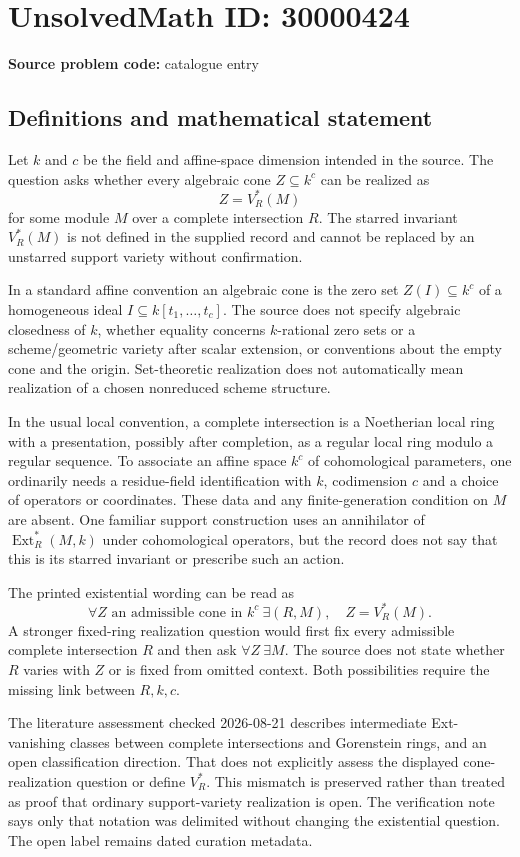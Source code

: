 \documentclass[11pt]{article}
\begin{document}
\section*{UnsolvedMath ID: 30000424}
\textbf{Source problem code:} catalogue entry
\subsection{Definitions and mathematical statement}
Let \(k\) and \(c\) be the field and affine-space dimension intended in the source. The question asks whether every algebraic cone \(Z\subseteq k^c\) can be realized as
\[
 Z=V_R^*(M)
\]
for some module \(M\) over a complete intersection \(R\). The starred invariant \(V_R^*(M)\) is not defined in the supplied record and cannot be replaced by an unstarred support variety without confirmation.

In a standard affine convention an algebraic cone is the zero set \(Z(I)\subseteq k^c\) of a homogeneous ideal \(I\subseteq k[t_1,\ldots,t_c]\). The source does not specify algebraic closedness of \(k\), whether equality concerns \(k\)-rational zero sets or a scheme/geometric variety after scalar extension, or conventions about the empty cone and the origin. Set-theoretic realization does not automatically mean realization of a chosen nonreduced scheme structure.

In the usual local convention, a complete intersection is a Noetherian local ring with a presentation, possibly after completion, as a regular local ring modulo a regular sequence. To associate an affine space \(k^c\) of cohomological parameters, one ordinarily needs a residue-field identification with \(k\), codimension \(c\) and a choice of operators or coordinates. These data and any finite-generation condition on \(M\) are absent. One familiar support construction uses an annihilator of \(\operatorname{Ext}_R^*(M,k)\) under cohomological operators, but the record does not say that this is its starred invariant or prescribe such an action.

The printed existential wording can be read as
\[
 \forall Z\text{ an admissible cone in }k^c\ \exists(R,M),\quad Z=V_R^*(M).
\]
A stronger fixed-ring realization question would first fix every admissible complete intersection \(R\) and then ask \(\forall Z\ \exists M\). The source does not state whether \(R\) varies with \(Z\) or is fixed from omitted context. Both possibilities require the missing link between \(R,k,c\).

The literature assessment checked 2026-08-21 describes intermediate Ext-vanishing classes between complete intersections and Gorenstein rings, and an open classification direction. That does not explicitly assess the displayed cone-realization question or define \(V_R^*\). This mismatch is preserved rather than treated as proof that ordinary support-variety realization is open. The verification note says only that notation was delimited without changing the existential question. The open label remains dated curation metadata.
\end{document}
